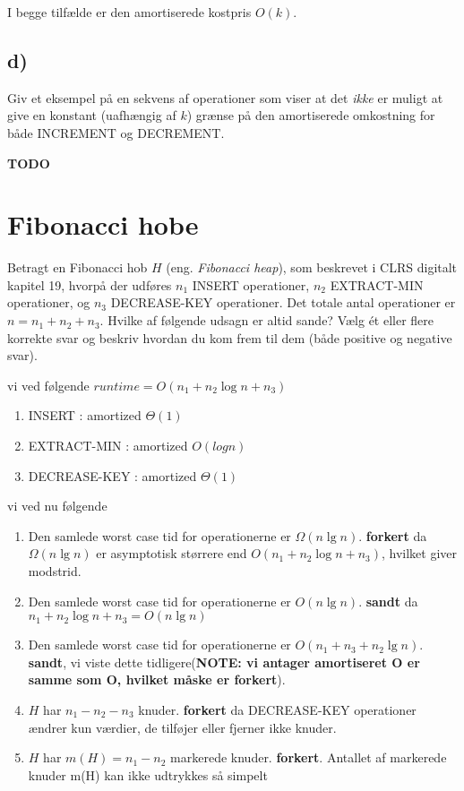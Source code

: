 \documentclass{article}
\theoremstyle{definition}
\begin{document}
I begge tilfælde er den amortiserede kostpris $O(k)$.

\subsection*{d)} Giv et eksempel på en sekvens af operationer som viser at det \textit{ikke} er muligt at give en konstant (uafhængig af $k$) grænse på den amortiserede omkostning for både INCREMENT og DECREMENT.

\textbf{TODO}

\section{Fibonacci hobe}

Betragt en Fibonacci hob $H$ (eng. \textit{Fibonacci heap}), som beskrevet i CLRS digitalt kapitel 19, hvorpå der udføres $n_1$ INSERT operationer, $n_2$ EXTRACT-MIN operationer, og $n_3$ DECREASE-KEY operationer. Det totale antal operationer er $n = n_1 + n_2 + n_3$. Hvilke af følgende udsagn er altid sande? Vælg ét eller flere korrekte svar og beskriv hvordan du kom frem til dem (både positive og negative svar).

vi ved følgende
$runtime = O(n_1 + n_2\log n + n_3)$

\begin{enumerate}
    \item INSERT : amortized $\Theta(1)$
    \item EXTRACT-MIN : amortized $O(log n)$
    \item DECREASE-KEY : amortized $\Theta(1)$
\end{enumerate}

vi ved nu følgende

\begin{enumerate}
    \item Den samlede worst case tid for operationerne er $\Omega(n\lg n)$. \textbf{forkert} da $\Omega(n\lg n)$ er asymptotisk størrere end $O(n_1 + n_2\log n + n_3)$, hvilket giver modstrid.
    \item Den samlede worst case tid for operationerne er $O(n\lg n)$.
    \textbf{sandt} da $n_1 + n_2\log n + n_3 = O(n\lg n)$

    \item Den samlede worst case tid for operationerne er $O(n_1 + n_3 + n_2\lg n)$. \textbf{sandt}, vi viste dette tidligere(\textbf{NOTE: vi antager amortiseret O er samme som O, hvilket måske er forkert}). 
    \item $H$ har $n_1 - n_2 - n_3$ knuder. \textbf{forkert} da DECREASE-KEY operationer ændrer kun værdier, de tilføjer eller fjerner ikke knuder.
    \item $H$ har $m(H) = n_1 - n_2$ markerede knuder. \textbf{forkert}. Antallet af markerede knuder m(H) kan ikke udtrykkes så simpelt
\end{enumerate}
\end{document}
